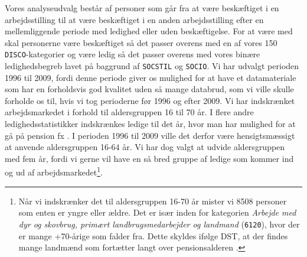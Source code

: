 Vores analyseudvalg består af personer som går fra at være beskæftiget i en arbejdsstilling til at være beskæftiget i en anden arbejdsstilling efter en mellemliggende periode med ledighed eller uden beskæftigelse. For at være med skal personerne være beskæftiget så det passer overens med en af vores 150 \texttt{DISCO}-kategorier og være ledig så det passer overens med vores binære ledighedsbegreb lavet på baggrund af \texttt{SOCSTIL} og \texttt{SOCIO}. Vi har udvalgt perioden 1996 til 2009, fordi denne periode giver os mulighed for at have et datamateriale som har en forholdsvis god kvalitet uden så mange databrud, som vi ville skulle forholde os til, hvis vi tog perioderne før 1996 og efter 2009. Vi har indskrænket arbejdsmarkedet i forhold til aldersgruppen 16 til 70 år. I flere andre ledighedsstatistikker indskrænkes ledige til det år, hvor man har mulighed for at gå på pension fx \parencite{Bjoersted2012, Bang-Petersen2012, DST2014a}. I perioden 1996 til 2009 ville det derfor være hensigtsmæssigt at anvende aldersgruppen 16-64 år. Vi har dog valgt at udvide aldersgruppen med fem år, fordi vi gerne vil have en så bred gruppe af ledige som kommer ind og ud af arbejdsmarkedet\footnote{Når vi indskrænker det til aldersgruppen 16-70 år mister vi 8508 personer som enten er yngre eller ældre. Det er især inden for kategorien \emph{Arbejde med dyr og skovbrug, primært landbrugsmedarbejder og landmand} (\texttt{6120}), hvor der er mange +70-årige som falder fra. Dette skyldes ifølge DST, at der findes mange landmænd som fortætter langt over pensionsalderen \parencite{DST2012}.}.





















